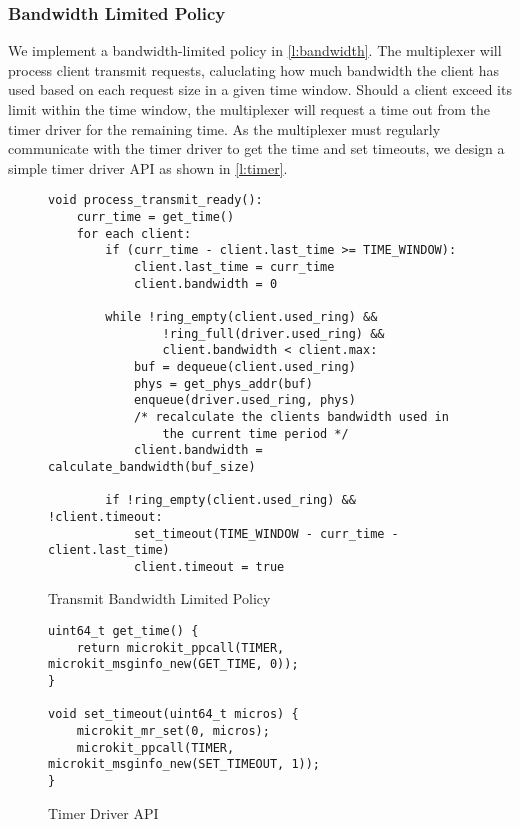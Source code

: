 \subsubsection{Bandwidth Limited Policy}\label{s:bandwidth}

We implement a bandwidth-limited policy in \autoref{l:bandwidth}. The multiplexer will 
process client transmit requests, caluclating how much bandwidth the client has used based on
each request size in a given time window. Should a client exceed its limit within the time window,
the multiplexer will request a time out from the timer driver for the remaining time. As the multiplexer must
regularly communicate with the timer driver to get the time and set timeouts, we design a simple timer driver
API as shown in \autoref{l:timer}. 

\begin{figure} [H]
    \begin{verbatim}
void process_transmit_ready():
    curr_time = get_time()
    for each client:
        if (curr_time - client.last_time >= TIME_WINDOW):
            client.last_time = curr_time
            client.bandwidth = 0
        
        while !ring_empty(client.used_ring) && 
                !ring_full(driver.used_ring) && 
                client.bandwidth < client.max:
            buf = dequeue(client.used_ring)
            phys = get_phys_addr(buf)
            enqueue(driver.used_ring, phys)
            /* recalculate the clients bandwidth used in 
                the current time period */ 
            client.bandwidth = calculate_bandwidth(buf_size)

        if !ring_empty(client.used_ring) && !client.timeout:
            set_timeout(TIME_WINDOW - curr_time - client.last_time)
            client.timeout = true
\end{verbatim}
\caption{Transmit Bandwidth Limited Policy}
\label{l:bandwidth}
\end{figure}

\begin{figure} [H]
    \begin{verbatim}
uint64_t get_time() {
    return microkit_ppcall(TIMER, microkit_msginfo_new(GET_TIME, 0));
}
        
void set_timeout(uint64_t micros) {
    microkit_mr_set(0, micros);
    microkit_ppcall(TIMER, microkit_msginfo_new(SET_TIMEOUT, 1));
}
\end{verbatim}
\caption{Timer Driver API}
\label{l:timer}
\end{figure}

